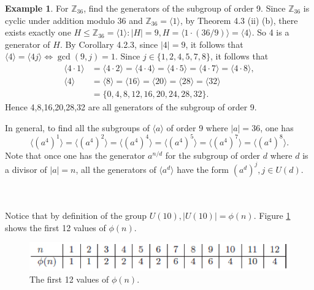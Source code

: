 \documentclass{article}
\theoremstyle{definition}
\newtheorem{definition}{Definition}[section]
\newtheorem{example}{Example}[section]
\begin{document}
\begin{example}
    For $\mathbb{Z}_{36}$, find the generators of the subgroup of order 9. Since $\mathbb{Z}_{36}$ is cyclic under addition modulo 36 and $\mathbb{Z}_{36}=\langle 1 \rangle$, by Theorem 4.3 (ii) (b), there exists exactly one $H \leq \mathbb{Z}_{36}= \langle 1 \rangle: |H|=9, H=\langle 1 \cdot (36/9) \rangle = \langle 4 \rangle$. So 4 is a generator of $H$. By Corollary 4.2.3, since $|4| =9$, it follows that $\langle 4 \rangle = \langle 4j \rangle \iff \gcd(9,j)=1$. Since $j \in \{1,2,4,5,7,8\}$, it follows that
    \begin{align*}
        \langle 4\cdot1 \rangle &= \langle 4\cdot2 \rangle = \langle 4\cdot4 \rangle = \langle 4\cdot5 \rangle = \langle 4\cdot7 \rangle = \langle 4\cdot8 \rangle, \\
        \langle 4 \rangle &= \langle 8 \rangle = \langle 16 \rangle = \langle 20 \rangle = \langle 28 \rangle = \langle 32 \rangle \\
        &= \{0,4,8,12,16,20,24,28,32\}.
    \end{align*}
    Hence 4,8,16,20,28,32 are all generators of the subgroup of order 9.
    
    In general, to find all the subgroups of $\langle a \rangle$ of order 9 where $|a|=36$, one has
    \begin{equation*}
        \langle (a^4)^1 \rangle = \langle (a^4)^2 \rangle = \langle (a^4)^4 \rangle = \langle (a^4)^5 \rangle = \langle (a^4)^7 \rangle = \langle (a^4)^8 \rangle.
    \end{equation*}
    Note that once one has the generator $a^{n/d}$ for the subgroup of order $d$ where $d$ is a divisor of $|a|=n$, all the generators of $\langle a^d \rangle$ have the form $(a^d)^j, j \in U(d)$.
\end{example}

\noindent{}
\\ \\
Notice that by definition of the group $U(10), |U(10)|=\phi(n)$. Figure \ref{euler_phi_func} shows the first 12 values of $\phi(n)$.
\\ 
\begin{figure}[!htbp]
    \centering
    \includegraphics[width=0.7\linewidth]{figures/euler_phi_func.png}
    \caption{The first 12 values of $\phi(n)$.}
    \label{euler_phi_func}
\end{figure}
\end{document}
